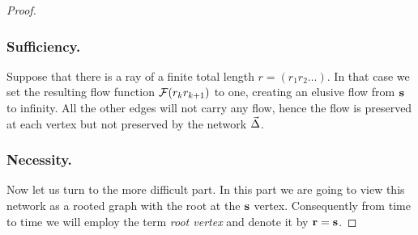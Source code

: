 \documentclass[12pt]{article}
\begin{document}
\begin{proof}
      \subsubsection*{Sufficiency.}
      Suppose that there is a ray of a finite total length $r=(r_1 r_2 \dots)$.
      In that case we set the resulting flow function $\mathcal{F}(r_k r_{k+1})$ to one, creating an elusive flow
        from $\mathbf{s}$ to infinity. All the other edges will not carry any flow, hence the flow is preserved
        at each vertex but not preserved by the network $\vec{\Delta}$.
      \subsubsection*{Necessity.}
      Now let us turn to the more difficult part.
      In this part we are going to view this network as a rooted graph with the root at the $\mathbf{s}$ vertex.
      Consequently from time to time we will employ the term \emph{root vertex} and denote it by $\mathbf{r} = \mathbf{s}$.


\end{proof}
\end{document}
